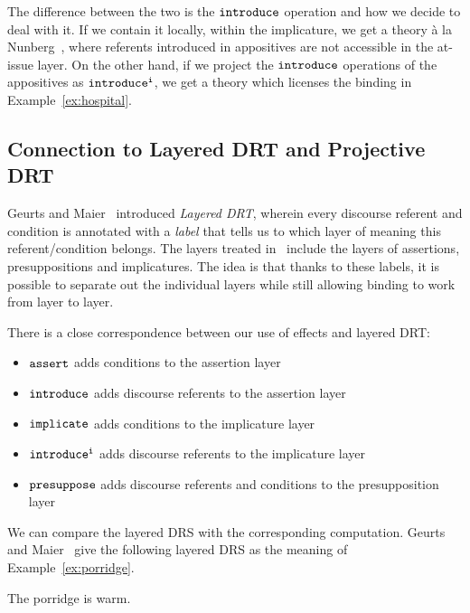 The difference between the two is the $\mathtt{introduce}$ operation and how we
decide to deal with it. If we contain it locally, within the implicature,
we get a theory à la Nunberg~\cite{nunberg1990linguistics}, where referents
introduced in appositives are not accessible in the at-issue layer. On the
other hand, if we project the $\mathtt{introduce}$ operations of the
appositives as $\mathtt{introduce^i}$, we get a theory which licenses the
binding in Example~\ref{ex:hospital}.


\subsection{Connection to Layered DRT and Projective DRT}

Geurts and Maier~\cite{geurts2003layered} introduced \emph{Layered DRT},
wherein every discourse referent and condition is annotated with a
\emph{label} that tells us to which layer of meaning this
referent/condition belongs. The layers treated in~\cite{geurts2003layered}
include the layers of assertions, presuppositions and implicatures. The
idea is that thanks to these labels, it is possible to separate out the
individual layers while still allowing binding to work from layer to layer.

There is a close correspondence between our use of effects and layered
DRT:

\begin{itemize}
\item $\mathtt{assert}$ adds conditions to the assertion layer
\item $\mathtt{introduce}$ adds discourse referents to the assertion layer
\item $\mathtt{implicate}$ adds conditions to the implicature layer
\item $\mathtt{introduce^i}$ adds discourse referents to the implicature layer
\item $\mathtt{presuppose}$ adds discourse referents and conditions to the
  presupposition layer
\end{itemize}

We can compare the layered DRS with the corresponding computation. Geurts
and Maier~\cite{geurts2003layered} give the following layered DRS as the
meaning of Example~\ref{ex:porridge}.

\begin{exe}
  \ex The porridge is warm. \label{ex:porridge}
\end{exe}

